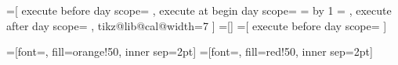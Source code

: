 \documentclass[a4paper]{article}
\begin{document}
\makeatletter
=[
  execute before day scope={%
  },
  execute at begin day scope={%
    \pgfmathsetlength\pgf@x{\tikz@lib@cal@xshift}%
    \ifnum{}
    \else
    \c@pgf@counta=\pgfcalendarcurrentweekday
    \advance\c@pgf@counta by 1
    \fi
    \pgf@x=\c@pgf@counta\pgf@x
    \pgftransformxshift{\pgf@x}
  },
  execute after day scope={
  },
  tikz@lib@cal@width=7
]
=[]
=[
  execute before day scope={%
  }%
]
\makeatother

=[font=\footnotesize, fill=orange!50, inner sep=2pt]
=[font=\footnotesize, fill=red!50, inner sep=2pt]
\end{document}
